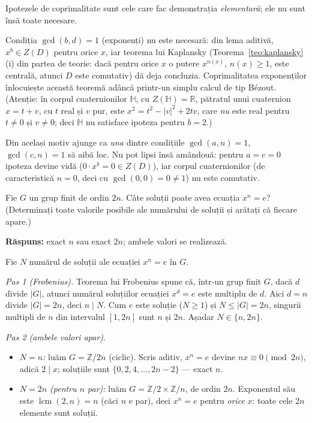 \begin{obs}
Ipotezele de coprimalitate sunt cele care fac demonstrația
\emph{elementară}; ele nu sunt însă toate necesare.

Condiția $\gcd(b,d)=1$ (exponenți) nu este necesară: din lema aditivă,
$x^{b}\in Z(D)$ pentru orice $x$, iar teorema lui Kaplansky
(Teorema~\ref{teo:kaplansky}(i) din partea de teorie: dacă pentru orice
$x$ o putere $x^{n(x)}$, $n(x)\ge1$, este centrală, atunci $D$ este
comutativ) dă deja concluzia. Coprimalitatea exponenților înlocuiește
această teoremă adâncă printr-un simplu calcul de tip Bézout. (Atenție:
în corpul cuaternionilor $\mathbb{H}$, cu $Z(\mathbb{H})=\mathbb{R}$,
pătratul unui cuaternion $x=t+v$, cu $t$ real și $v$ pur, este
$x^{2}=t^{2}-|v|^{2}+2tv$, care \emph{nu} este real pentru $t\neq0$ și
$v\neq0$; deci $\mathbb{H}$ nu satisface ipoteza pentru $b=2$.)

Din același motiv ajunge ca \emph{una} dintre condițiile
$\gcd(a,n)=1$, $\gcd(c,n)=1$ să aibă loc. Nu pot lipsi însă amândouă:
pentru $a=c=0$ ipoteza devine vidă ($0\cdot x^{b}=0\in Z(D)$), iar
corpul cuaternionilor (de caracteristică $n=0$, deci cu
$\gcd(0,0)=0\neq1$) nu este comutativ.
\end{obs}

\setcounter{cat}{3}\setcounter{problemaX}{0}

\begin{problema}
Fie $G$ un grup finit de ordin $2n$. Câte soluții poate avea
ecuația $x^{n}=e$? (Determinați toate valorile posibile ale
numărului de soluții și arătați că fiecare apare.)
\end{problema}

\noindent\textbf{Răspuns:} exact $n$ sau exact $2n$; ambele valori se
realizează.

\begin{solutie}
Fie $N$ numărul de soluții ale ecuației $x^{n}=e$ în $G$.

\smallskip
\textit{Pas 1 (Frobenius).} Teorema lui Frobenius spune că, într-un
grup finit $G$, dacă $d$ divide $|G|$, atunci numărul soluțiilor
ecuației $x^{d}=e$ este multiplu de $d$. Aici $d=n$ divide $|G|=2n$, deci
$n\mid N$. Cum $e$ este soluție ($N\ge 1$) și $N\le|G|=2n$, singurii
multipli de $n$ din intervalul $[1,2n]$ sunt $n$ și $2n$. Așadar
$N\in\{n,2n\}$.

\smallskip
\textit{Pas 2 (ambele valori apar).}
\begin{itemize}[nosep,leftmargin=1.4em]
  \item \emph{$N=n$:} luăm $G=\mathbb{Z}/2n$ (ciclic). Scris aditiv,
        $x^{n}=e$ devine $nx\equiv 0\pmod{2n}$, adică $2\mid x$; soluțiile
        sunt $\{0,2,4,\dots,2n-2\}$ --- exact $n$.
  \item \emph{$N=2n$ (pentru $n$ par):} luăm
        $G=\mathbb{Z}/2\times\mathbb{Z}/n$, de ordin $2n$. Exponentul său
        este $\operatorname{lcm}(2,n)=n$ (căci $n$ e par), deci $x^{n}=e$
        pentru \emph{orice} $x$: toate cele $2n$ elemente sunt soluții.
\end{itemize}
\end{solutie}

